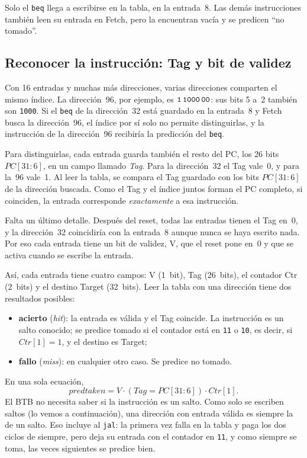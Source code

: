 \documentclass[11pt,a4paper]{article}
\newcommand{\sig}[1]{\textit{#1}}
\newcommand{\ins}[1]{\texttt{#1}}
\begin{document}
Solo el \ins{beq} llega a escribirse en la tabla, en la entrada~8. Las demás instrucciones
también leen su entrada en Fetch, pero la encuentran vacía y se predicen ``no tomado''.

\subsection{Reconocer la instrucción: Tag y bit de validez}

Con 16 entradas y muchas más direcciones, varias direcciones comparten el mismo índice. La
dirección~96, por ejemplo, es $\texttt{1\,1000\,00}$: sus bits 5 a~2 también son
\texttt{1000}. Si el \ins{beq} de la dirección~32 está guardado en la entrada~8 y Fetch busca
la dirección~96, el índice por sí solo no permite distinguirlas, y la instrucción de la
dirección~96 recibiría la predicción del \ins{beq}.

Para distinguirlas, cada entrada guarda también el resto del PC, los 26 bits
$\sig{PC}[31{:}6]$, en un campo llamado \emph{Tag}. Para la dirección~32 el Tag vale~0, y
para la~96 vale~1. Al leer la tabla, se compara el Tag guardado con los bits
$\sig{PC}[31{:}6]$ de la dirección buscada. Como el Tag y el índice juntos forman el PC
completo, si coinciden, la entrada corresponde \emph{exactamente} a esa instrucción.

Falta un último detalle. Después del reset, todas las entradas tienen el Tag en~0, y la
dirección~32 coincidiría con la entrada~8 aunque nunca se haya escrito nada. Por eso cada
entrada tiene un bit de validez, V, que el reset pone en~0 y que se activa cuando se escribe
la entrada.

Así, cada entrada tiene cuatro campos: V (1~bit), Tag (26~bits), el contador Ctr (2~bits) y
el destino Target (32~bits). Leer la tabla con una dirección tiene dos resultados posibles:
\begin{itemize}
  \item \textbf{acierto} (\emph{hit}): la entrada es válida y el Tag coincide. La
        instrucción es un salto conocido; se predice tomado si el contador está en
        \texttt{11} o \texttt{10}, es decir, si $\sig{Ctr}[1] = 1$, y el destino es Target;
  \item \textbf{fallo} (\emph{miss}): en cualquier otro caso. Se predice no tomado.
\end{itemize}
En una sola ecuación,
\[
  \sig{predtaken} = \sig{V}\cdot(\sig{Tag} = \sig{PC}[31{:}6])\cdot\sig{Ctr}[1].
\]
El BTB no necesita saber si la instrucción es un salto. Como solo se escriben saltos (lo
vemos a continuación), una dirección con entrada válida es siempre la de un salto. Eso
incluye al \ins{jal}: la primera vez falla en la tabla y paga los dos ciclos de siempre,
pero deja su entrada con el contador en \texttt{11}, y como siempre se toma, las veces
siguientes se predice bien.
\end{document}
